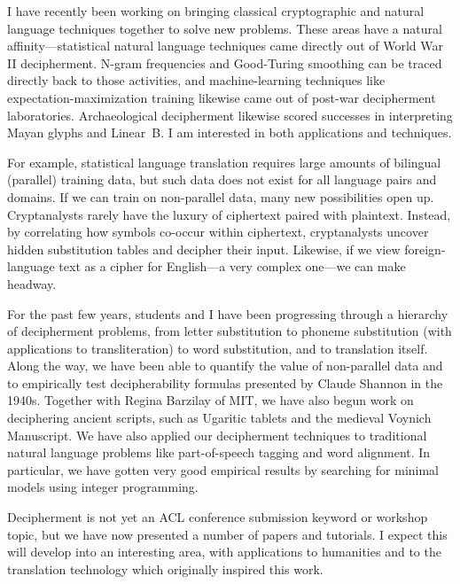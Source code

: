 
I have recently been working on bringing classical cryptographic
and natural language techniques together to solve new problems.  These
areas have a natural affinity---statistical natural language techniques
came directly out of World War II
decipherment.  N-gram frequencies and
Good-Turing smoothing can be traced directly back to those activities,
and machine-learning techniques like expectation-maximization training 
likewise came out of post-war
decipherment laboratories.  
Archaeological decipherment likewise scored successes in 
interpreting Mayan glyphs
and Linear~B.  I am interested in both applications and techniques.

For example, statistical language translation requires large amounts of bilingual (parallel)
training data, but such data does not exist for all language pairs 
and domains.  If we can train on non-parallel data, 
many new possibilities open up.  
Cryptanalysts rarely have the luxury of ciphertext paired with plaintext.  
Instead, by correlating how symbols co-occur within 
ciphertext, cryptanalysts uncover hidden substitution tables and decipher 
their input.  Likewise, if we view foreign-language text as a cipher 
for English---a very complex one---we can make headway.

For the past few years, students and I have been progressing through 
a hierarchy of decipherment problems, from letter substitution to 
phoneme substitution (with applications to transliteration) to word 
substitution, and to translation itself.  Along the way, we have been 
able to quantify the value of non-parallel data and to empirically 
test decipherability formulas presented by Claude Shannon in the 
1940s.  Together with Regina Barzilay of MIT, we have also begun work 
on deciphering ancient scripts, such as Ugaritic tablets and the 
medieval Voynich Manuscript.
We have also applied our decipherment techniques to traditional 
natural language problems like part-of-speech tagging and word alignment.  In particular,
we have gotten very good empirical results by searching for minimal
models using integer programming.  

Decipherment is not yet an ACL conference submission keyword or 
workshop topic, but we have now presented a number of papers
and tutorials.  I expect this
will develop into an interesting area, with applications to 
humanities and to the translation technology which originally 
inspired this work.

